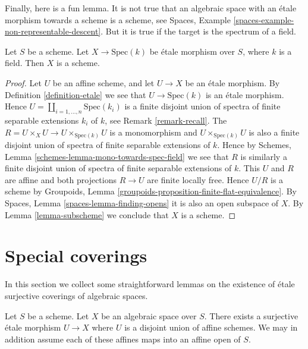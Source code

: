 \noindent
Finally, here is a fun lemma. It is not true that an algebraic space
with an \'etale morphism towards a scheme is a scheme, see
Spaces, Example \ref{spaces-example-non-representable-descent}.
But it is true if the target is the spectrum of a field.

\begin{lemma}
\label{lemma-etale-over-field-scheme}
Let $S$ be a scheme. Let $X \to \text{Spec}(k)$
be \'etale morphism over $S$, where $k$ is a field.
Then $X$ is a scheme.
\end{lemma}

\begin{proof}
Let $U$ be an affine scheme, and let $U \to X$ be an \'etale morphism. By
Definition \ref{definition-etale}
we see that $U \to \text{Spec}(k)$ is an \'etale
morphism. Hence $U = \coprod_{i = 1, \ldots, n} \text{Spec}(k_i)$
is a finite disjoint union of spectra of finite separable extensions
$k_i$ of $k$, see
Remark \ref{remark-recall}.
The $R = U \times_X U \to U \times_{\text{Spec}(k)} U$ is a monomorphism
and $U \times_{\text{Spec}(k)} U$ is also a finite disjoint union of
spectra of finite separable extensions of $k$. Hence by
Schemes, Lemma \ref{schemes-lemma-mono-towards-spec-field}
we see that $R$ is similarly a finite disjoint union of
spectra of finite separable extensions of $k$.
This $U$ and $R$ are affine and
both projections $R \to U$ are finite locally free.
Hence $U/R$ is a scheme by
Groupoids, Lemma \ref{groupoids-proposition-finite-flat-equivalence}.
By
Spaces, Lemma \ref{spaces-lemma-finding-opens}
it is also an open subspace of $X$. By
Lemma \ref{lemma-subscheme}
we conclude that $X$ is a scheme.
\end{proof}



\section{Special coverings}
\label{section-special-coverings}

\noindent
In this section we collect some straightforward lemmas on the existence
of \'etale surjective coverings of algebraic spaces.

\begin{lemma}
\label{lemma-cover-by-union-affines}
Let $S$ be a scheme.
Let $X$ be an algebraic space over $S$.
There exists a surjective \'etale morphism $U \to X$ where
$U$ is a disjoint union of affine schemes.
We may in addition assume each of these affines
maps into an affine open of $S$.
\end{lemma}

